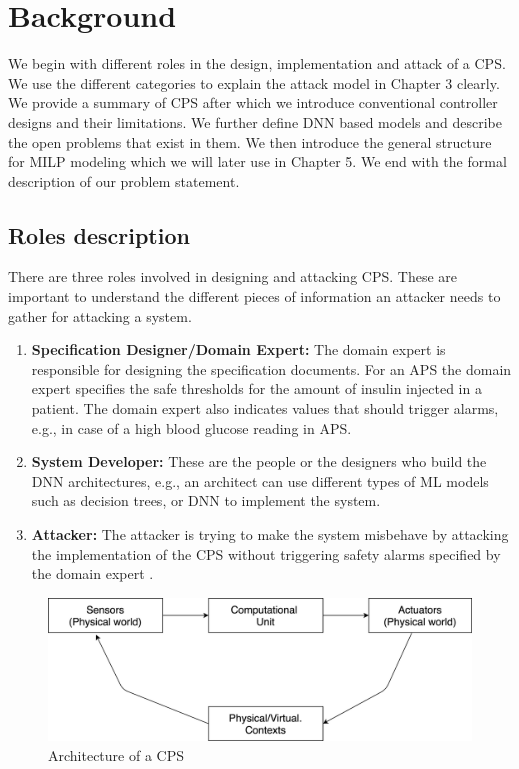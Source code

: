 \chapter{Background}
\label{background}

We begin with different roles in the design, implementation and attack of a \ac{CPS}. We use the different categories to explain the attack model in Chapter 3 clearly. 
We provide a summary of \ac{CPS} after which we introduce conventional controller designs and their limitations. 
We further define \ac{DNN} based models and describe the open problems that exist in them. 
We then introduce the  general structure for \ac{MILP} modeling which we will later use in Chapter 5. 
We end with the formal description of our problem statement.

\section{Roles description}
There are three roles involved in designing and attacking \ac{CPS}. These are important to understand the different pieces of information an attacker needs to gather for attacking a system.

\begin{enumerate}
	\item \textbf{Specification Designer/Domain Expert:} The domain expert is responsible for designing the specification documents. 
	For an \ac{APS} the domain expert specifies the safe thresholds for the amount of insulin injected in a patient. The domain expert also indicates values that should trigger alarms, e.g., in case of a high blood glucose reading in \ac{APS}.
	\item \textbf{System Developer:} These are the people or the designers who
	build the \ac{DNN} architectures, e.g., an architect can use different types of \ac{ML} models such as decision trees, or \ac{DNN} to implement the system.
	\item \textbf{Attacker:} The attacker is trying to make the system misbehave by attacking the implementation of the \ac{CPS} without triggering safety alarms specified by the domain expert . 
\end{enumerate}

\begin{figure}
	\centering
	\includegraphics[width=0.7\linewidth]{Images/Systemsdescription}
	\caption{Architecture of a CPS}
	\label{fig:systemsdescription}
\end{figure}

